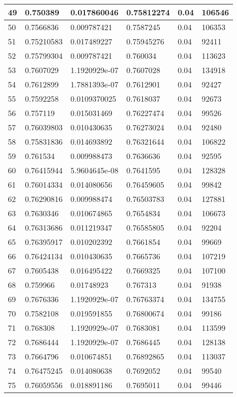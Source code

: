 \begin{longtable}{|l|l|l|l|l|l|}
49 & 0.750389 & 0.017860046 & 0.75812274 & 0.04 & 106546 \\ \hline 
50 & 0.7566836 & 0.009787421 & 0.7587245 & 0.04 & 106353 \\ \hline 
51 & 0.75210583 & 0.017489227 & 0.75945276 & 0.04 & 92411 \\ \hline 
52 & 0.75799304 & 0.009787421 & 0.760034 & 0.04 & 113623 \\ \hline 
53 & 0.7607029 & 1.1920929e-07 & 0.7607028 & 0.04 & 134918 \\ \hline 
54 & 0.7612899 & 1.7881393e-07 & 0.7612901 & 0.04 & 92427 \\ \hline 
55 & 0.7592258 & 0.0109370025 & 0.7618037 & 0.04 & 92673 \\ \hline 
56 & 0.757119 & 0.015031469 & 0.76227474 & 0.04 & 99526 \\ \hline 
57 & 0.76039803 & 0.010430635 & 0.76273024 & 0.04 & 92480 \\ \hline 
58 & 0.75831836 & 0.014693892 & 0.76321644 & 0.04 & 106822 \\ \hline 
59 & 0.761534 & 0.009988473 & 0.7636636 & 0.04 & 92595 \\ \hline 
60 & 0.76415944 & 5.9604645e-08 & 0.7641595 & 0.04 & 128328 \\ \hline 
61 & 0.76014334 & 0.014080656 & 0.76459605 & 0.04 & 99842 \\ \hline 
62 & 0.76290816 & 0.009988474 & 0.76503783 & 0.04 & 127881 \\ \hline 
63 & 0.7630346 & 0.010674865 & 0.7654834 & 0.04 & 106673 \\ \hline 
64 & 0.76313686 & 0.011219347 & 0.76585805 & 0.04 & 92204 \\ \hline 
65 & 0.76395917 & 0.010202392 & 0.7661854 & 0.04 & 99669 \\ \hline 
66 & 0.76424134 & 0.010430635 & 0.7665736 & 0.04 & 107219 \\ \hline 
67 & 0.7605438 & 0.016495422 & 0.7669325 & 0.04 & 107100 \\ \hline 
68 & 0.759966 & 0.01748923 & 0.767313 & 0.04 & 91938 \\ \hline 
69 & 0.7676336 & 1.1920929e-07 & 0.76763374 & 0.04 & 134755 \\ \hline 
70 & 0.7582108 & 0.019591855 & 0.76800674 & 0.04 & 99186 \\ \hline 
71 & 0.768308 & 1.1920929e-07 & 0.7683081 & 0.04 & 113599 \\ \hline 
72 & 0.7686444 & 1.1920929e-07 & 0.7686445 & 0.04 & 128138 \\ \hline 
73 & 0.7664796 & 0.010674851 & 0.76892865 & 0.04 & 113037 \\ \hline 
74 & 0.76475245 & 0.014080638 & 0.7692052 & 0.04 & 99540 \\ \hline 
75 & 0.76059556 & 0.018891186 & 0.7695011 & 0.04 & 99446 \\ \hline 
\end{longtable}